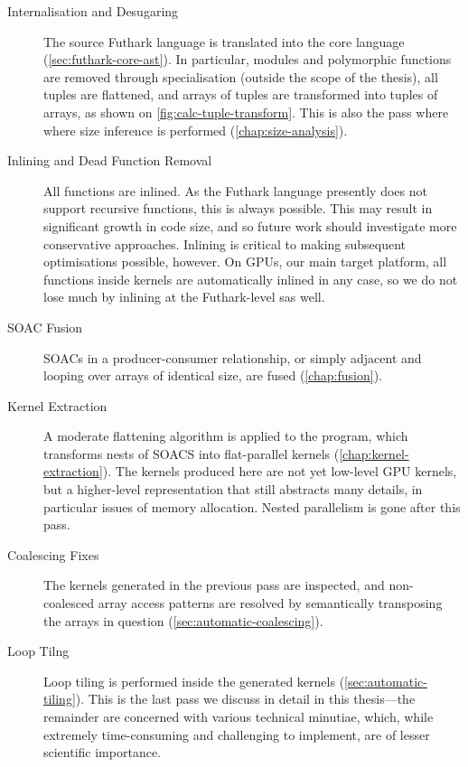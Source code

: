 \begin{description}
\item[Internalisation and Desugaring] The source Futhark language is
  translated into the core language (\cref{sec:futhark-core-ast}).  In
  particular, modules and polymorphic functions are removed through
  specialisation (outside the scope of the thesis), all tuples are
  flattened, and arrays of tuples are transformed into tuples of
  arrays, as shown on \ref{fig:calc-tuple-transform}.  This is also
  the pass where where size inference is performed
  (\cref{chap:size-analysis}).

\item[Inlining and Dead Function Removal] All functions are
inlined.  As the Futhark language presently does not support recursive
functions, this is always possible.  This may result in significant
growth in code size, and so future work should investigate more
conservative approaches.  Inlining is critical to making subsequent
optimisations possible, however.  On GPUs, our main target platform,
all functions inside kernels are automatically inlined in any case, so
we do not lose much by inlining at the Futhark-level sas well.

\item[SOAC Fusion] SOACs in a producer-consumer relationship, or
simply adjacent and looping over arrays of identical size, are fused
(\cref{chap:fusion}).

\item[Kernel Extraction] A moderate flattening algorithm is
applied to the program, which transforms nests of SOACS into
flat-parallel kernels (\cref{chap:kernel-extraction}).  The kernels
produced here are not yet low-level GPU kernels, but a higher-level
representation that still abstracts many details, in particular issues
of memory allocation.  Nested parallelism is gone after this pass.

\item[Coalescing Fixes] The kernels generated in the previous
pass are inspected, and non-coalesced array access patterns are
resolved by semantically transposing the arrays in question
(\cref{sec:automatic-coalescing}).

\item[Loop Tilng] Loop tiling is performed inside the generated
kernels (\cref{sec:automatic-tiling}).  This is the last pass we
discuss in detail in this thesis---the remainder are concerned with
various technical minutiae, which, while extremely time-consuming and
challenging to implement, are of lesser scientific importance.


\end{description}
